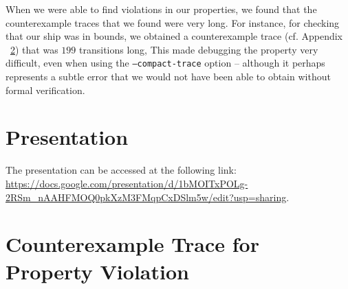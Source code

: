 \documentclass{article}
\begin{document}
            When we were able to find violations in our properties, we found
            that the counterexample traces that we found were very long. For
            instance, for checking that our ship was in bounds, we obtained a
            counterexample trace (cf. Appendix ~\ref{appendix:trace}) that was
            $199$ transitions long, This made debugging the property very
            difficult, even when using the \texttt{--compact-trace} option --
            although it perhaps represents a subtle error that we would not have
            been able to obtain without formal verification.

\section{Presentation}

    The presentation can be accessed at the following link:
    \url{https://docs.google.com/presentation/d/1bMOITxPOLg-2RSm_nAAHFMOQ0pkXzM3FMqpCxDSlm5w/edit?usp=sharing}.




\appendix
\section{Counterexample Trace for Property Violation}
\label{appendix:trace}

\end{document}
